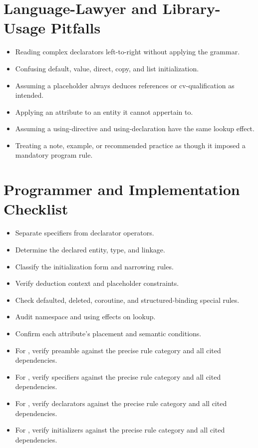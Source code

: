 \documentclass[11pt,letterpaper]{article}
\begin{document}
\section{Language-Lawyer and Library-Usage Pitfalls}
\begin{CornellReferencePitfallBox}\begin{itemize}[label=\textcolor{CornellReferenceAmber}{$\blacktriangleright$}]
\item Reading complex declarators left-to-right without applying the grammar.
\item Confusing default, value, direct, copy, and list initialization.
\item Assuming a placeholder always deduces references or cv-qualification as intended.
\item Applying an attribute to an entity it cannot appertain to.
\item Assuming a using-directive and using-declaration have the same lookup effect.
\item Treating a note, example, or recommended practice as though it imposed a mandatory program rule.
\end{itemize}\end{CornellReferencePitfallBox}
\section{Programmer and Implementation Checklist}
\begin{CornellReferenceChecklistBox}\begin{itemize}[label=$\square$]
\item Separate specifiers from declarator operators.
\item Determine the declared entity, type, and linkage.
\item Classify the initialization form and narrowing rules.
\item Verify deduction context and placeholder constraints.
\item Check defaulted, deleted, coroutine, and structured-binding special rules.
\item Audit namespace and using effects on lookup.
\item Confirm each attribute's placement and semantic conditions.
\item For , verify preamble against the precise rule category and all cited dependencies.
\item For , verify specifiers against the precise rule category and all cited dependencies.
\item For , verify declarators against the precise rule category and all cited dependencies.
\item For , verify initializers against the precise rule category and all cited dependencies.
\end{itemize}\end{CornellReferenceChecklistBox}
\end{document}
